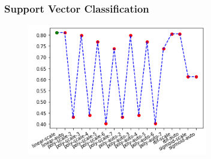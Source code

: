 \documentclass[a4paper, 11pt]{article}
\begin{document}
\subsubsection{Support Vector Classification}\label{hiper_svc}
\begin{figure}[h]
 \centering
    \includegraphics[width=0.7\textwidth]{LosQueFaltan/crosval_svc.png}
\end{figure}

\newpage
\end{document}
